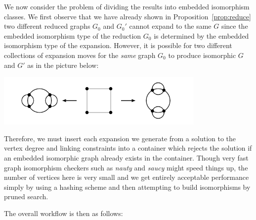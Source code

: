 \documentclass[amsmath,secnumarabic,floatfix,amssymb,nofootinbib,nobibnotes,letterpaper,11pt,tightenlines,showkeys]{revtex4}
\theoremstyle{definition}
\newcommand{\nauty}{\textit{nauty} }
\newcommand{\saucy}{\textit{saucy} }
\begin{document}
We now consider the problem of dividing the results into embedded isomorphism classes. We first observe that we have already shown in Proposition~\ref{prop:reduce} two different reduced graphs $G_0$ and $G_0'$ cannot expand to the same $G$ since the embedded isomorphism type of the reduction $G_0$ is determined by the embedded isomorphism type of the expansion. However, it is possible for two different collections of expansion moves for the \emph{same} graph $G_0$ to produce isomorphic $G$ and $G'$ as in the picture below:
\begin{center}
\includegraphics[width=4in]{isomorphic-expansions.pdf}
\end{center}
Therefore, we must insert each expansion we generate from a solution to the vertex degree and linking constraints into a container which rejects the solution if an embedded isomorphic graph already exists in the container. Though very fast graph isomorphism checkers such as \nauty and \saucy might speed things up, the number of vertices here is very small and we get entirely acceptable performance simply by using a hashing scheme and then attempting to build isomorphisms by pruned search.

The overall workflow is then as follows:
\begin{center}
\end{center}



\end{document}

